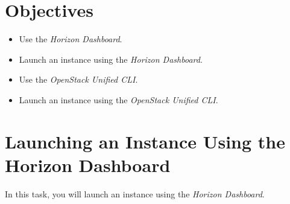 \documentclass[letterpaper, 12pt]{article}
\begin{document}
\section*{Objectives}
\label{sec:objectives}
\begin{itemize}[itemsep=0pt]
    \item Use the \textit{Horizon Dashboard}.
    \item Launch an instance using the \textit{Horizon Dashboard}.
    \item Use the \textit{OpenStack Unified CLI}.
    \item Launch an instance using the \textit{OpenStack Unified CLI}.
\end{itemize}
\clearpage

\section{Launching an Instance Using the Horizon Dashboard}
In this task, you will launch an instance using the \textit{Horizon Dashboard}.
\end{document}
